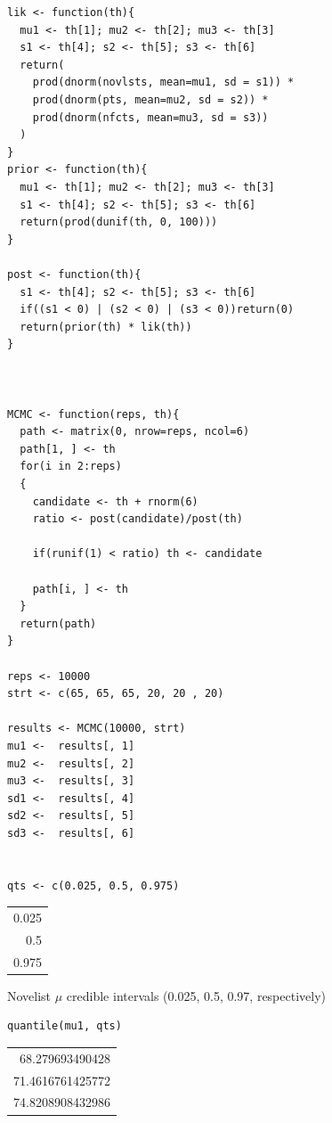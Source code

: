 \documentclass[11pt]{article}
\begin{document}
\begin{verbatim}
lik <- function(th){
  mu1 <- th[1]; mu2 <- th[2]; mu3 <- th[3]
  s1 <- th[4]; s2 <- th[5]; s3 <- th[6]
  return(
    prod(dnorm(novlsts, mean=mu1, sd = s1)) *
    prod(dnorm(pts, mean=mu2, sd = s2)) *
    prod(dnorm(nfcts, mean=mu3, sd = s3))
  )
}
prior <- function(th){
  mu1 <- th[1]; mu2 <- th[2]; mu3 <- th[3]
  s1 <- th[4]; s2 <- th[5]; s3 <- th[6]
  return(prod(dunif(th, 0, 100)))
}

post <- function(th){
  s1 <- th[4]; s2 <- th[5]; s3 <- th[6]
  if((s1 < 0) | (s2 < 0) | (s3 < 0))return(0)
  return(prior(th) * lik(th))
}



MCMC <- function(reps, th){
  path <- matrix(0, nrow=reps, ncol=6)
  path[1, ] <- th
  for(i in 2:reps)
  {
    candidate <- th + rnorm(6)
    ratio <- post(candidate)/post(th)

    if(runif(1) < ratio) th <- candidate

    path[i, ] <- th
  }
  return(path)
}

reps <- 10000
strt <- c(65, 65, 65, 20, 20 , 20)

results <- MCMC(10000, strt)
mu1 <-  results[, 1]
mu2 <-  results[, 2]
mu3 <-  results[, 3]
sd1 <-  results[, 4]
sd2 <-  results[, 5]
sd3 <-  results[, 6]


qts <- c(0.025, 0.5, 0.975)

\end{verbatim}

\begin{center}
\begin{tabular}{r}
0.025\\
0.5\\
0.975\\
\end{tabular}
\end{center}



Novelist \(\mu\) credible intervals (0.025, 0.5, 0.97, respectively)
\begin{verbatim}
quantile(mu1, qts)
\end{verbatim}

\begin{center}
\begin{tabular}{r}
68.279693490428\\
71.4616761425772\\
74.8208908432986\\
\end{tabular}
\end{center}
\end{document}
